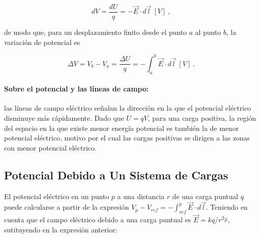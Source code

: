 \documentclass{tufte-handout}
\begin{document}




\begin{equation}
dV = \frac{dU}{q} = -\vec{E}\cdot d\vec{l}~[V]~,
\end{equation}

de modo que, para un desplazamiento finito desde el punto $a$ al punto $b$, la variación de potencial es

\begin{equation}
\Delta V = V_b - V_a = \frac{\Delta U}{q} = -\int_a^b \vec{E}\cdot d\vec{l}~[V]~.
\end{equation}

\paragraph{Sobre el potencial y las líneas de campo:} las líneas de campo eléctrico señalan la dirección en la que el potencial eléctrico disminuye más rápidamente. Dado que $U = qV$, para una carga positiva, la región del espacio en la que existe menor energía potencial es también la de menor potencial eléctrico, motivo por el cual las cargas positivas se dirigen a las zonas con menor potencial eléctrico.

\subsection{Potencial Debido a Un Sistema de Cargas}

El potencial eléctrico en un punto $p$ a una distancia $r$ de una carga puntual $q$ puede calcularse a partir de la expresión $V_p - V_{ref} = -\int_{ref}^p \vec{E}\cdot d\vec{l}$. Teniendo en cuenta que el campo eléctrico debido a una carga puntual es $\vec{E} = kq/r^2 \hat{r}$, sutituyendo en la expresión anterior:
\end{document}
